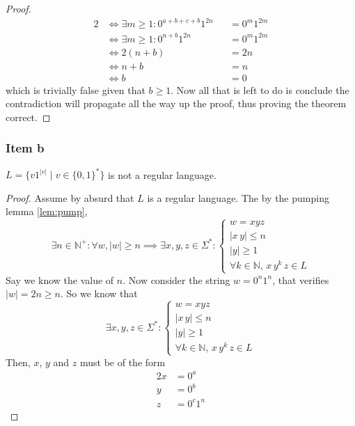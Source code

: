 \documentclass[docid=TP07]{tcom_TP}
\begin{document}
{\begin{proof}
\begin{alignat*}{2}
	& \iff \exists m \geq 1 \colon 0^{a+b+c+b}1^{2n}   &&= 0^m1^{2m} \\
	& \iff \exists m \geq 1 \colon 0^{n+b}1^{2n}       &&= 0^m1^{2m} \\
	& \iff 2(n+b)                                      &&= 2n\\
	& \iff n+b                                         &&= n\\
	& \iff b                                           &&= 0
\end{alignat*}
which is trivially false given that $b \geq 1$. Now all that is left to do is conclude the contradiction will propagate all the way up the proof, thus proving the theorem correct.
\end{proof}
\pagebreak
\subsubsection{Item b}
\begin{theorem}
$L=\{v1^{|v|}\mid v \in \{0,1\}^*\}$ is not a regular language.
\end{theorem}
\begin{proof}
Assume  by absurd that $L$ is a regular language. The by the pumping lemma \eqref{lem:pump},
\begin{equation*}
	\exists n \in \mathbb{N}^+ \colon \forall w, |w|\geq n \implies \exists x, y, z \in \Sigma^* \colon 
	\begin{cases}
		w = xyz \\
		|x\,y| \leq n\\
		|y| \geq 1\\
		\forall k \in \mathbb{N},\,x\,y^k\,z \in L
\end{cases}
\end{equation*}
Say we know the value of $n$. Now consider the string $w=0^n1^n$, that verifies $|w|=2n \geq n$. So we know that
\begin{equation*}
\exists x, y, z \in \Sigma^* \colon 
\begin{cases}
	w = xyz \\
	|x\,y| \leq n\\
	|y| \geq 1\\
	\forall k \in \mathbb{N},\,x\,y^k\,z \in L
\end{cases}
\end{equation*}
Then, $x$, $y$ and $z$ must be of the form
\begin{alignat*}{2}
	x &= 0^a\\
	y &= 0^b\\
	z &= 0^c1^{n}

\end{alignat*}
\end{proof}}
\end{document}
